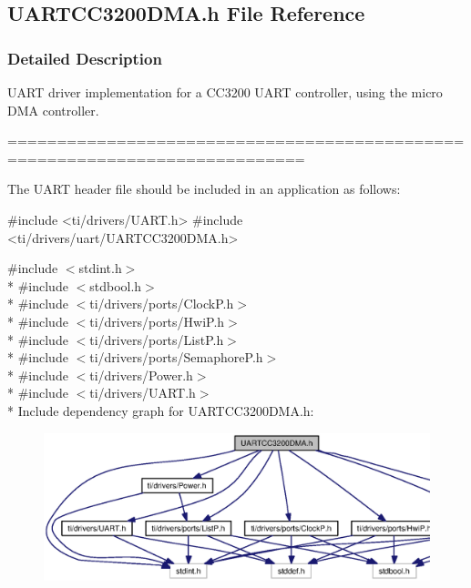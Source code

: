 \subsection{U\+A\+R\+T\+C\+C3200\+D\+M\+A.\+h File Reference}
\label{_u_a_r_t_c_c3200_d_m_a_8h}


\subsubsection{Detailed Description}
U\+A\+R\+T driver implementation for a C\+C3200 U\+A\+R\+T controller, using the micro D\+M\+A controller. 

============================================================================

The U\+A\+R\+T header file should be included in an application as follows\+: 
\begin{DoxyCode}
\textcolor{preprocessor}{#include <ti/drivers/UART.h>}
\textcolor{preprocessor}{#include <ti/drivers/uart/UARTCC3200DMA.h>}
\end{DoxyCode}
 

{\ttfamily \#include $<$stdint.\+h$>$}\\*
{\ttfamily \#include $<$stdbool.\+h$>$}\\*
{\ttfamily \#include $<$ti/drivers/ports/\+Clock\+P.\+h$>$}\\*
{\ttfamily \#include $<$ti/drivers/ports/\+Hwi\+P.\+h$>$}\\*
{\ttfamily \#include $<$ti/drivers/ports/\+List\+P.\+h$>$}\\*
{\ttfamily \#include $<$ti/drivers/ports/\+Semaphore\+P.\+h$>$}\\*
{\ttfamily \#include $<$ti/drivers/\+Power.\+h$>$}\\*
{\ttfamily \#include $<$ti/drivers/\+U\+A\+R\+T.\+h$>$}\\*
Include dependency graph for U\+A\+R\+T\+C\+C3200\+D\+M\+A.\+h\+:
\nopagebreak
\begin{figure}[H]
\begin{center}
\leavevmode
\includegraphics[width=350pt]{_u_a_r_t_c_c3200_d_m_a_8h__incl}
\end{center}
\end{figure}
